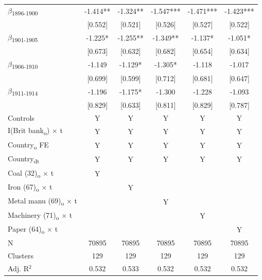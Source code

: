 {\begin{tabular}{l*{5}{c}}
$\beta$\textsubscript{1896-1900}&      -1.414** &      -1.324** &      -1.547***&      -1.471***&      -1.423***\\
            &     [0.552]   &     [0.521]   &     [0.526]   &     [0.527]   &     [0.522]   \\
$\beta$\textsubscript{1901-1905}&      -1.225*  &      -1.255** &      -1.349** &      -1.137*  &      -1.051*  \\
            &     [0.673]   &     [0.632]   &     [0.682]   &     [0.654]   &     [0.634]   \\
$\beta$\textsubscript{1906-1910}&      -1.149   &      -1.129*  &      -1.305*  &      -1.118   &      -1.017   \\
            &     [0.699]   &     [0.599]   &     [0.712]   &     [0.681]   &     [0.647]   \\
$\beta$\textsubscript{1911-1914}&      -1.196   &      -1.175*  &      -1.300   &      -1.228   &      -1.093   \\
            &     [0.829]   &     [0.633]   &     [0.811]   &     [0.829]   &     [0.787]   \\
Controls    &           Y   &           Y   &           Y   &           Y   &           Y   \\
I(Brit bank\textsubscript{o}) $\times$ t&           Y   &           Y   &           Y   &           Y   &           Y   \\
Country\textsubscript{o} FE&           Y   &           Y   &           Y   &           Y   &           Y   \\
Country\textsubscript{dt}&           Y   &           Y   &           Y   &           Y   &           Y   \\
Coal (32)\textsubscript{o} $\times$ t&           Y   &               &               &               &               \\
Iron (67)\textsubscript{o} $\times$ t&               &           Y   &               &               &               \\
Metal manu (69)\textsubscript{o} $\times$ t&               &               &           Y   &               &               \\
Machinery (71)\textsubscript{o} $\times$ t&               &               &               &           Y   &               \\
Paper (64)\textsubscript{o} $\times$ t&               &               &               &               &           Y   \\
\midrule
N           &       70895   &       70895   &       70895   &       70895   &       70895   \\
Clusters    &         129   &         129   &         129   &         129   &         129   \\
Adj. R{$^2$}&       0.532   &       0.533   &       0.532   &       0.532   &       0.532   \\
\bottomrule
\end{tabular}
}
